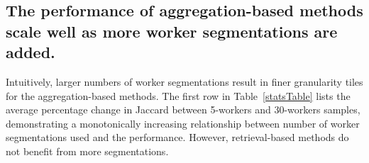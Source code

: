 \subsection*{The performance of aggregation-based methods scale well as more worker segmentations are added.}
\par \noindent Intuitively, larger numbers of worker segmentations result in finer granularity tiles for the aggregation-based methods. The first row in Table~\ref{statsTable} lists the average percentage change in Jaccard between 5-workers and 30-workers samples, demonstrating a monotonically increasing relationship between number of worker segmentations used and the performance. However, retrieval-based methods do not benefit from more segmentations.
\begin{table}[h!]
     \small
      \caption{Jaccard percentage change due to worker scaling and clustering. Algorithms with * makes use of ground truth information.}
      \label{statsTable} 
\end{table}
